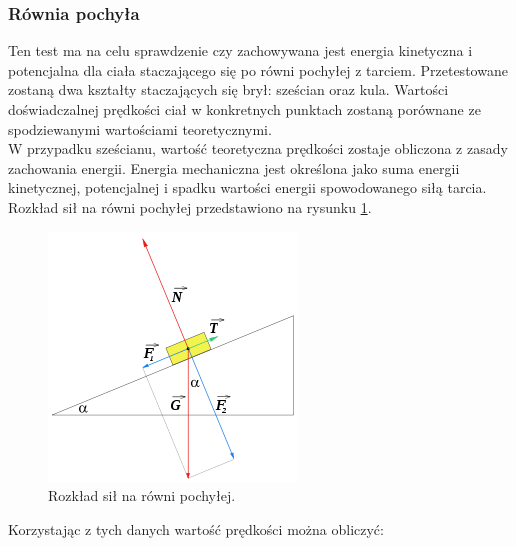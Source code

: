 \subsubsection{Równia pochyła}
Ten test ma na celu sprawdzenie czy zachowywana jest energia kinetyczna i
potencjalna dla ciała staczającego się po równi pochyłej z tarciem.
Przetestowane zostaną dwa kształty staczających się brył: sześcian oraz kula.
Wartości doświadczalnej prędkości ciał w konkretnych punktach zostaną porównane
ze spodziewanymi wartościami teoretycznymi.\\
W przypadku sześcianu, wartość teoretyczna prędkości zostaje obliczona z zasady
zachowania energii. Energia mechaniczna jest określona jako suma energii
kinetycznej, potencjalnej i spadku wartości energii spowodowanego siłą tarcia.
Rozkład sił na równi pochyłej przedstawiono na rysunku \ref{fig:rownia}.

\begin{figure}
\centering
\includegraphics[scale = 0.6]{./img/rownia.PNG}
\caption{Rozkład sił na równi pochyłej.}
\label{fig:rownia}
\end{figure}

Korzystając z tych danych wartość prędkości można obliczyć:

